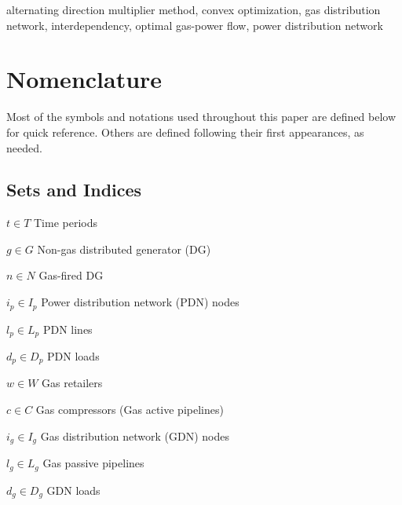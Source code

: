 \documentclass[journal]{IEEEtran}
\begin{document}
\begin{IEEEkeywords}
 alternating direction multiplier method, convex optimization, gas distribution network, interdependency, optimal gas-power flow, power distribution network
\end{IEEEkeywords}

\section*{Nomenclature}
Most of the symbols and notations used throughout this paper are defined below for quick reference. Others are defined following their first appearances, as needed.

\subsection{Sets and Indices}
\begin{IEEEdescription}
\item [$t\in T$]  Time periods
\item [$g\in G$]  Non-gas distributed generator (DG)
\item [$n\in N$]  Gas-fired DG
\item [$i_p \in I_p$]   Power distribution network (PDN) nodes
\item [$l_p \in L_p$]   PDN lines
\item [$d_p \in D_p$]   PDN loads
\item [$w \in W$]   Gas retailers
\item [$c \in C$]   Gas compressors (Gas active pipelines)
\item [$i_g \in I_g$]   Gas distribution network (GDN) nodes
\item [$l_g \in L_g$]   Gas passive pipelines
\item [$d_g \in D_g$]   GDN loads
\end{IEEEdescription}
\end{document}
